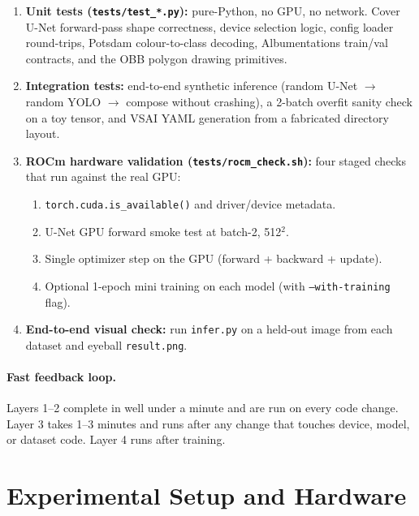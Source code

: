 \documentclass[11pt,a4paper]{article}
\begin{document}
\begin{enumerate}[leftmargin=*, itemsep=4pt]
  \item \textbf{Unit tests (\texttt{tests/test\_*.py}):} pure-Python, no GPU, no
    network. Cover U-Net forward-pass shape correctness, device selection logic,
    config loader round-trips, Potsdam colour-to-class decoding, Albumentations
    train/val contracts, and the OBB polygon drawing primitives.
  \item \textbf{Integration tests:} end-to-end synthetic inference (random
    U-Net $\rightarrow$ random YOLO $\rightarrow$ compose without crashing),
    a 2-batch overfit sanity check on a toy tensor, and VSAI YAML generation
    from a fabricated directory layout.
  \item \textbf{ROCm hardware validation (\texttt{tests/rocm\_check.sh}):} four
    staged checks that run against the real GPU:
    \begin{enumerate}[label=\arabic*.]
      \item \texttt{torch.cuda.is\_available()} and driver/device metadata.
      \item U-Net GPU forward smoke test at batch-2, 512$^2$.
      \item Single optimizer step on the GPU (forward + backward + update).
      \item Optional 1-epoch mini training on each model
        (with \texttt{--with-training} flag).
    \end{enumerate}
  \item \textbf{End-to-end visual check:} run \texttt{infer.py} on a held-out
    image from each dataset and eyeball \texttt{result.png}.
\end{enumerate}

\paragraph{Fast feedback loop.} Layers 1--2 complete in well under a minute and
are run on every code change. Layer 3 takes 1--3 minutes and runs after any
change that touches device, model, or dataset code. Layer 4 runs after training.

\section{Experimental Setup and Hardware}
\end{document}
